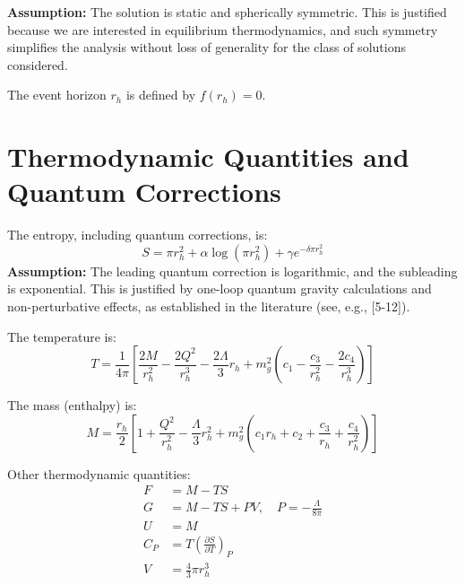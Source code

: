 \documentclass[12pt]{article}
\begin{document}
\textbf{Assumption:} The solution is static and spherically symmetric. This is justified because we are interested in equilibrium thermodynamics, and such symmetry simplifies the analysis without loss of generality for the class of solutions considered.

The event horizon $r_h$ is defined by $f(r_h) = 0$.

\section{Thermodynamic Quantities and Quantum Corrections}
The entropy, including quantum corrections, is:
\begin{equation}
S = \pi r_h^2 + \alpha \log(\pi r_h^2) + \gamma e^{-\delta \pi r_h^2}
\end{equation}
\textbf{Assumption:} The leading quantum correction is logarithmic, and the subleading is exponential. This is justified by one-loop quantum gravity calculations and non-perturbative effects, as established in the literature (see, e.g., [5-12]).

The temperature is:
\begin{equation}
T = \frac{1}{4\pi} \left[ \frac{2M}{r_h^2} - \frac{2Q^2}{r_h^3} - \frac{2\Lambda}{3} r_h + m_g^2 \left(c_1 - \frac{c_3}{r_h^2} - \frac{2c_4}{r_h^3}\right) \right]
\end{equation}

The mass (enthalpy) is:
\begin{equation}
M = \frac{r_h}{2} \left[ 1 + \frac{Q^2}{r_h^2} - \frac{\Lambda}{3} r_h^2 + m_g^2 (c_1 r_h + c_2 + \frac{c_3}{r_h} + \frac{c_4}{r_h^2}) \right]
\end{equation}

Other thermodynamic quantities:
\begin{align}
F &= M - T S \\
G &= M - T S + P V, \quad P = -\frac{\Lambda}{8\pi} \\
U &= M \\
C_P &= T \left( \frac{\partial S}{\partial T} \right)_P \\
V &= \frac{4}{3} \pi r_h^3
\end{align}
\end{document}
